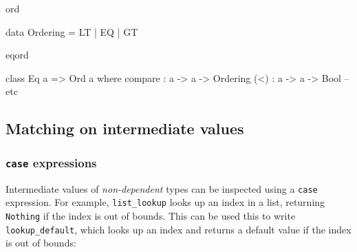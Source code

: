 \begin{SaveVerbatim}{ord}

data Ordering = LT | EQ | GT

\end{SaveVerbatim}

\begin{SaveVerbatim}{eqord}

class Eq a => Ord a where
    compare : a -> a -> Ordering
    (<) : a -> a -> Bool
    -- etc

\end{SaveVerbatim}

\subsection{Matching on intermediate values}

%
%
%
%
%
%
%
%
%

\subsubsection{\texttt{case} expressions}

Intermediate values of \emph{non-dependent} types can be inspected using a
\texttt{case} expression.  For example, \texttt{list\_lookup} looks up an index
in a list, returning \texttt{Nothing} if the index is out of bounds. This can
be used this to write \texttt{lookup\_default}, which looks up an index and
returns a default value if the index is out of bounds:

